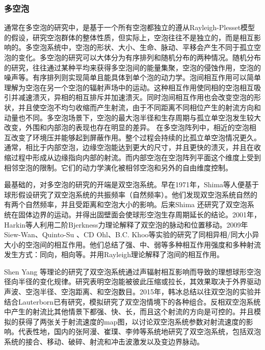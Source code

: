 \subsubsection{多空泡}
通常在多空泡的研究中，是基于一个所有空泡都独立的遵从Rayleigh-Plesset模型的假设，研究空泡群体的整体性质，但实际上，空泡往往不是独立的，而是相互影响的\cite{__2022,blake_bubble_1999,lauterborn_physics_2010,blake_acoustic_1999,Biesheuvel1984,zhang_ensemble_1994,fuster_modelling_2011,arora_effect_2007,servant_interaction_2003,johnsen_shock-induced_2008,betney_computational_2015,lauterborn_acoustic_2007}。多空泡系统中，空泡的形状、大小、生命、脉动、平移会产生不同于孤立空泡的变化。多空泡的研究可以大体分为有序排列和随机分布的两种情况。随机分布的研究，往往通过某种平均来获得多空泡间的能量集聚，空泡的侵蚀作用，空泡的噪声等。有序排列则实现简单且能具体到单个泡的动力学。泡间相互作用可以简单理解为空泡在另一个空泡的辐射声场中的运动。这种相互作用使同相的空泡相互吸引并减速溃灭，异相的相互排斥并加速溃灭。同时泡间相互作用也会改变空泡的形状，并且使空泡不均匀收缩而产生射流，由于不同距离不同相位产生的射流方向和动量也不同。多空泡场景下，空泡的最大泡半径和生存周期与孤立单空泡发生较大改变，外围和内部泡的表现也存在明显的差异。 在多空泡阵列中，相近的空泡相互改变了环境压并能够起到屏蔽作用。整个过程会持续的比孤立单空泡情况更久。通常，相比于内部空泡，边缘空泡能达到更大的尺寸，并且更快的溃灭，并且在收缩过程中形成从边缘指向内部的射流。而内部空泡在空泡阵列平面这个维度上受到相邻空泡的限制。它们的动力学演化被相邻空泡和另外的自由维度控制。 

最基础的，对多空泡的研究的开端是双空泡系统。早在1971年，Shima等人便基于球形假设研究了双空泡系统的共振频率（自然频率）\cite{shima_natural_1971}。他们发现双空泡系统自然的有两个自然频率，并且受距离和空泡大小的影响。后来Shima 还研究了双空泡系统在固体边界的运动\cite{shima_behavior_1992}。并得出固壁面会使球形空泡生存周期延长的结论。2001年，Harkin等人利用二阶Bjerkness力理论解释了双空泡的脉动和位置移动\cite{harkin_coupled_2001}。2009年Siew-Wan、Quinto-Su 、CD Ohl、B.C. Khoo等实验的研究了同相异相/同大小异大小的空泡间的相互作用\cite{fong_interactions_2009,quinto-su_interaction_2009,chew_interaction_2011}。他们总结了强、中、弱等多种相互作用强度和多种射流发生方式：同向，相向等。并用Rayleigh理论解释了泡间的相互作用。

Shen Yang 等理论的研究了双空泡系统通过声辐射相互影响而导致的理想球形空泡径向半径的变化规律\cite{shen_role_2021}。研究表明空泡能被彼此压缩或拉长，其效果取决于外界驱动声波、空泡半径、空泡距离、和空泡数目。2015年，韩冰总结以往双空泡的实验并结合Lauterborn已有研究，模拟研究了双空泡情境下的各种组合\cite{han_dynamics_2015}。反相双空泡系统中产生的射流比其他情景下都强、快、长，而且这个射流的方向是可控的。并且模拟的获得了两张关于射流速度的map图，以讨论双空泡系统参数对射流速度的影响。代表性地，国内的张阿漫、崔璞、李帅等系统地研究了双空泡系统，包括双泡系统的接合、移动、破碎、射流和冲击波激发以及变边界脉动\cite{han_experimental_2018,li_experimental_2019,wang_jet_2019,cui_experimental_2020,liu_interaction_2021}。

